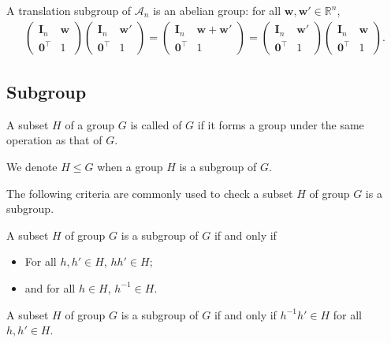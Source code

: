 A translation subgroup of $\mathcal{A}_{n}$ is an abelian group: for all $\bm{w}, \bm{w}' \in \mathbb{R}^{n}$,
\begin{align*}
  \begin{pmatrix} \bm{I}_{n} & \bm{w} \\ \bm{0}^{\top} & 1 \end{pmatrix}
  \begin{pmatrix} \bm{I}_{n} & \bm{w}' \\ \bm{0}^{\top} & 1 \end{pmatrix}
  =
  \begin{pmatrix} \bm{I}_{n} & \bm{w} + \bm{w}' \\ \bm{0}^{\top} & 1 \end{pmatrix}
  =
  \begin{pmatrix} \bm{I}_{n} & \bm{w}' \\ \bm{0}^{\top} & 1 \end{pmatrix}
  \begin{pmatrix} \bm{I}_{n} & \bm{w} \\ \bm{0}^{\top} & 1 \end{pmatrix}.
\end{align*}

\subsection{Subgroup}

\begin{screen}
  \begin{defn}
    A subset $H$ of a group $G$ is called  of $G$ if it forms a group under the same operation as that of $G$.
  \end{defn}
\end{screen}
We denote $H \leq G$ when a group $H$ is a subgroup of $G$.

The following criteria are commonly used to check a subset $H$ of group $G$ is a subgroup.
\begin{screen}
  \begin{prop}
    A subset $H$ of group $G$ is a subgroup of $G$ if and only if
    \begin{itemize}
      \item For all $h, h' \in H$, $hh' \in H$;
      \item and for all $h \in H$, $h^{-1} \in H$.
    \end{itemize}
  \end{prop}
\end{screen}
\begin{screen}
  \begin{prop}
    A subset $H$ of group $G$ is a subgroup of $G$ if and only if $h^{-1}h' \in H$ for all $h, h' \in H$.
  \end{prop}
\end{screen}

